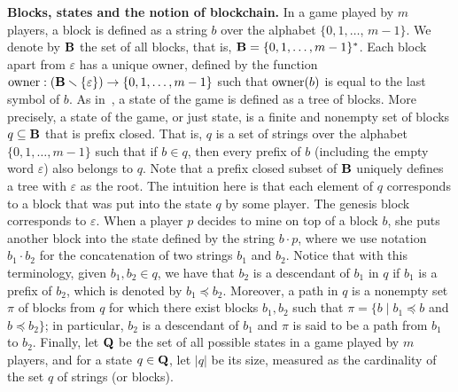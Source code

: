 \smallskip
\noindent
\textbf{Blocks, states and the notion of blockchain. }%
In a game played by $m$ players, a block is defined as a string $b$ over the alphabet $\{0,1,\ldots$, $m-1\}$. We denote by $\mathbf{B}$ the set of all blocks, that is, $\mathbf{B} = \{0,1,\ldots , m-1\}^*$. Each block apart from $\varepsilon$ has a unique owner, defined by the function $\text{\rm owner}: (\mathbf{B} \smallsetminus \{\varepsilon\}) \rightarrow \{0,1, \ldots ,m-1\}$ such that $\text{\rm owner}(b)$ is equal to the last symbol of $b$. As in~\cite{mininggames:2016}, a state of the game is defined as a tree of blocks. More precisely, a state of the game, or just state, is a finite and nonempty set of blocks $q \subseteq \mathbf{B}$ that is prefix closed. That is, $q$ is a set of strings over the alphabet $\{0,1,\ldots, m-1\}$ such that if $b\in q$, then every prefix of $b$ (including the empty word $\varepsilon$) also belongs to $q$. Note that a prefix closed subset of $\mathbf{B}$ uniquely defines a tree with $\varepsilon$ as the root.
%
The intuition here is that each element of $q$ corresponds to a block that was put into the state $q$ by some player. The genesis block corresponds to $\varepsilon$. When a player $p$ decides to mine on top of a block $b$, she puts another block into the state defined by the string $b\cdot p$, where we use notation $b_1 \cdot b_2$ for the concatenation of two strings $b_1$ and $b_2$.
%
Notice that with this terminology, given $b_1, b_2 \in q$, we have that $b_2$ is a descendant of $b_1$ in $q$ if $b_1$ is a prefix of $b_2$, which is denoted by $b_1 \preceq b_2$. Moreover, a path in $q$ is a nonempty set $\pi$ of blocks from $q$ for which there exist blocks $b_1, b_2$ such that $\pi = \{ b \mid b_1 \preceq b$ and $b \preceq b_2\}$; in particular, $b_2$ is a descendant of $b_1$ and $\pi$ is said to be a path from $b_1$ to $b_2$.
Finally, let $\mathbf{Q}$ be the set of all possible states in a game played by $m$ players, and for a state $q \in \mathbf{Q}$, let $|q|$ be its size, measured as the cardinality of the set $q$ of strings (or blocks).

